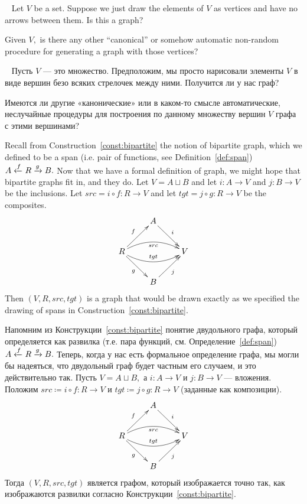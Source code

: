 \documentclass[../main/CT4S-EN-RU]{subfiles}
\begin{document}
\begin{exerciseENG}~
\sexc Let $V$ be a set. Suppose we just draw the elements of $V$ as vertices and have no arrows between them. Is this a graph?
\item Given $V,$ is there any other “canonical” or somehow automatic non-random procedure for generating a graph with those vertices? 
\endsexc
\end{exerciseENG}

\begin{exerciseRUS}~
\sexc Пусть $V$ — это множество. Предположим, мы просто нарисовали элементы $V$ в виде вершин безо всяких стрелочек между ними. Получится ли у нас граф?
\item Имеются ли другие «канонические» или в каком-то смысле автоматические, неслучайные процедуры для построения по данному множеству вершин $V$ графа с этими вершинами? 
\endsexc
\end{exerciseRUS}

\begin{exampleENG}
Recall from Construction~\ref{const:bipartite} the notion of bipartite graph, which we defined to be a span (i.e. pair of functions, see Definition~\ref{def:span}) $A\xleftarrow{f}R\xrightarrow{g}B.$ Now that we have a formal definition of graph, we might hope that bipartite graphs fit in, and they do. Let $V=A\sqcup B$ and let $i\colon A{→} V$ and $j\colon B{→} V$ be the inclusions. Let $src=i\circ f\colon R{→} V$ and let $tgt=j\circ g\colon R{→} V$ be the composites.
$$
\xymatrix{&A\ar[dr]^i\\R\ar@/^1pc/[rr]_{src}\ar@/_1pc/[rr]^{tgt}\ar[ur]^f\ar[dr]_g&&V\\&B\ar[ur]_j}
$$ 
Then $(V,R,src,tgt)$ is a graph that would be drawn exactly as we specified the drawing of spans in Construction~\ref{const:bipartite}.
\end{exampleENG}

\begin{exampleRUS}
Напомним из Конструкции~\ref{const:bipartite} понятие двудольного графа, который определяется как развилка (т.е. пара функций, см. Определение~\ref{def:span}) $A\xleftarrow{f}R\xrightarrow{g}B.$ Теперь, когда у нас есть формальное определение графа, мы могли бы надеяться, что двудольный граф будет частным его случаем, и это действительно так. Пусть $V=A\sqcup B,$ а $i\colon A{→} V$ и $j\colon B{→} V$ — вложения. Положим $src{\coloneqq}i\circ f\colon R{→} V$ и $tgt{\coloneqq}j\circ g\colon R{→} V$ (заданные как композиции).
$$\xymatrix{
      &  A\ar[dr]^i  \\
    R\ar@/^1pc/[rr]_{src}\ar@/_1pc/[rr]^{tgt}\ar[ur]^f\ar[dr]_g  &  &  V  \\
      &  B\ar[ur]_j
}$$ 
Тогда $(V,R,src,tgt)$ является графом, который изображается точно так, как изображаются развилки согласно Конструкции~\ref{const:bipartite}.
\end{exampleRUS}
\end{document}
